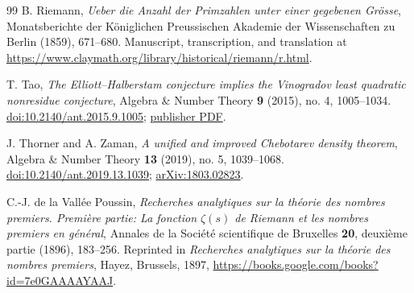 \begin{thebibliography}{99}
B. Riemann,
\emph{Ueber die Anzahl der Primzahlen unter einer gegebenen Gr\"osse},
Monatsberichte der K\"oniglichen Preussischen Akademie der Wissenschaften
zu Berlin (1859), 671--680.
Manuscript, transcription, and translation at
\url{https://www.claymath.org/library/historical/riemann/r.html}.

T. Tao,
\emph{The Elliott--Halberstam conjecture implies the Vinogradov least
quadratic nonresidue conjecture},
Algebra \& Number Theory \textbf{9} (2015), no. 4, 1005--1034.
\href{https://doi.org/10.2140/ant.2015.9.1005}{doi:10.2140/ant.2015.9.1005};
\href{https://msp.org/ant/2015/9-4/ant-v9-n4-p09-p.pdf}{publisher PDF}.

J. Thorner and A. Zaman,
\emph{A unified and improved Chebotarev density theorem},
Algebra \& Number Theory \textbf{13} (2019), no. 5, 1039--1068.
\href{https://doi.org/10.2140/ant.2019.13.1039}{doi:10.2140/ant.2019.13.1039};
\href{https://arxiv.org/abs/1803.02823}{arXiv:1803.02823}.

C.-J. de la Vall\'ee Poussin,
\emph{Recherches analytiques sur la th\'eorie des nombres premiers.
Premi\`ere partie: La fonction $\zeta(s)$ de Riemann et les nombres
premiers en g\'en\'eral},
Annales de la Soci\'et\'e scientifique de Bruxelles \textbf{20},
deuxi\`eme partie (1896), 183--256.
Reprinted in \emph{Recherches analytiques sur la th\'eorie des nombres
premiers}, Hayez, Brussels, 1897,
\url{https://books.google.com/books?id=7e0GAAAAYAAJ}.

\end{thebibliography}


